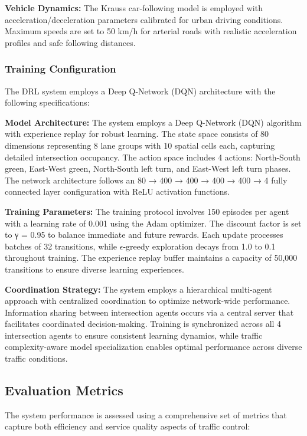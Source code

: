 \textbf{Vehicle Dynamics:} The Krauss car-following model is employed with acceleration/deceleration parameters calibrated for urban driving conditions. Maximum speeds are set to 50 km/h for arterial roads with realistic acceleration profiles and safe following distances.

\subsubsection{Training Configuration}

The DRL system employs a Deep Q-Network (DQN) architecture with the following specifications:

\textbf{Model Architecture:} The system employs a Deep Q-Network (DQN) algorithm with experience replay for robust learning. The state space consists of 80 dimensions representing 8 lane groups with 10 spatial cells each, capturing detailed intersection occupancy. The action space includes 4 actions: North-South green, East-West green, North-South left turn, and East-West left turn phases. The network architecture follows an 80 → 400 → 400 → 400 → 400 → 4 fully connected layer configuration with ReLU activation functions.

\textbf{Training Parameters:} The training protocol involves 150 episodes per agent with a learning rate of 0.001 using the Adam optimizer. The discount factor is set to γ = 0.95 to balance immediate and future rewards. Each update processes batches of 32 transitions, while $\epsilon$-greedy exploration decays from 1.0 to 0.1 throughout training. The experience replay buffer maintains a capacity of 50,000 transitions to ensure diverse learning experiences.

\textbf{Coordination Strategy:} The system employs a hierarchical multi-agent approach with centralized coordination to optimize network-wide performance. Information sharing between intersection agents occurs via a central server that facilitates coordinated decision-making. Training is synchronized across all 4 intersection agents to ensure consistent learning dynamics, while traffic complexity-aware model specialization enables optimal performance across diverse traffic conditions.

\subsection{Evaluation Metrics}\label{subsec2b-2}

The system performance is assessed using a comprehensive set of metrics that capture both efficiency and service quality aspects of traffic control:

